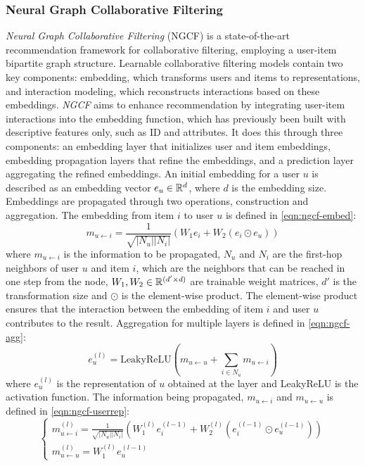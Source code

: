 \subsubsection{Neural Graph Collaborative Filtering}\label{subsec:ngcf-desc}
\textit{Neural Graph Collaborative Filtering} (NGCF) is a state-of-the-art recommendation framework for collaborative filtering, employing a user-item bipartite graph structure.
Learnable collaborative filtering models contain two key components: embedding, which transforms users and items to representations, and interaction modeling, which reconstructs interactions based on these embeddings.
\textit{NGCF} aims to enhance recommendation by integrating user-item interactions into the embedding function, which has previously been built with descriptive features only, such as ID and attributes.
It does this through three components: an embedding layer that initializes user and item embeddings, embedding propagation layers that refine the embeddings, and a prediction layer aggregating the refined embeddings.
An initial embedding for a user $u$ is described as an embedding vector $e_u \in \mathbb{R}^d$, where $d$ is the embedding size.
Embeddings are propagated through two operations, construction and aggregation.
The embedding from item $i$ to user $u$ is defined in \autoref{eqn:ngcf-embed}:
\begin{equation}\label{eqn:ngcf-embed}
    m_{u \leftarrow i} = \frac{1}{\sqrt{|N_u||N_i|}} (W_1e_i + W_2(e_i \odot e_u))
\end{equation}
where $m_{u \leftarrow i}$ is the information to be propagated, $N_u$ and $N_i$ are the first-hop neighbors of user $u$ and item $i$, which are the neighbors that can be reached in one step from the node, $W_1, W_2 \in \mathbb{R}^{(d' \times d)}$ are trainable weight matrices, $d'$ is the transformation size and $\odot$ is the element-wise product.
The element-wise product ensures that the interaction between the embedding of item $i$ and user $u$ contributes to the result.
Aggregation for multiple layers is defined in \autoref{eqn:ngcf-agg}:
\begin{equation}\label{eqn:ngcf-agg}
    e_{u}^{(l)} = \textrm{LeakyReLU}(m_{u \leftarrow u} + \sum_{i \in N_u} m_{u \leftarrow i})
\end{equation}
where $e_u^{(l)}$ is the representation of $u$ obtained at the layer and LeakyReLU is the activation function.
The information being propagated, $m_{u \leftarrow i}$ and $m_{u \leftarrow u}$ is defined in \autoref{eqn:ngcf-userrep}:
\begin{equation}\label{eqn:ngcf-userrep}
  \begin{cases}
    m_{u \leftarrow i}^{(l)} = \frac{1}{\sqrt{|N_u||N_i|}} (W_1^{(l)} e_i^{(l-1)} + W_2^{(l)} (e_i^{(l-1)} \odot e_u^{(l-1)}))\\
    m_{u \leftarrow u}^{(l)} = W_1^{(l)}e_u^{(l-1)}
  \end{cases}
\end{equation}
